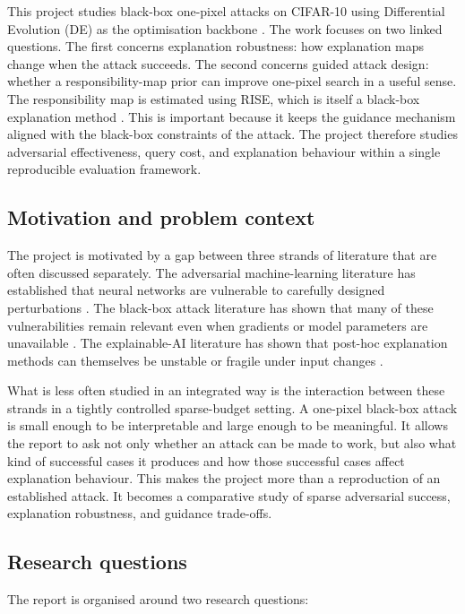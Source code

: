 This project studies black-box one-pixel attacks on CIFAR-10 \cite{krizhevsky2009cifar} using Differential Evolution (DE) as the optimisation backbone \cite{storn1997de}.
The work focuses on two linked questions.
The first concerns explanation robustness: how explanation maps change when the attack succeeds.
The second concerns guided attack design: whether a responsibility-map prior can improve one-pixel search in a useful sense.
The responsibility map is estimated using RISE, which is itself a black-box explanation method \cite{petsiuk2018rise}.
This is important because it keeps the guidance mechanism aligned with the black-box constraints of the attack.
The project therefore studies adversarial effectiveness, query cost, and explanation behaviour within a single reproducible evaluation framework.

\subsection{Motivation and problem context}
The project is motivated by a gap between three strands of literature that are often discussed separately.
The adversarial machine-learning literature has established that neural networks are vulnerable to carefully designed perturbations \cite{goodfellow2015explaining,madry2018towards}.
The black-box attack literature has shown that many of these vulnerabilities remain relevant even when gradients or model parameters are unavailable \cite{papernot2017practical,chen2017zoo,brendel2018decision}.
The explainable-AI literature has shown that post-hoc explanation methods can themselves be unstable or fragile under input changes \cite{adebayo2018sanity,ghorbani2019fragile,dombrowski2019explanations}.

What is less often studied in an integrated way is the interaction between these strands in a tightly controlled sparse-budget setting.
A one-pixel black-box attack is small enough to be interpretable and large enough to be meaningful.
It allows the report to ask not only whether an attack can be made to work, but also what kind of successful cases it produces and how those successful cases affect explanation behaviour.
This makes the project more than a reproduction of an established attack.
It becomes a comparative study of sparse adversarial success, explanation robustness, and guidance trade-offs.

\subsection{Research questions}
The report is organised around two research questions:

